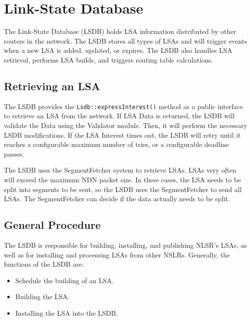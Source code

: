 \section{Link-State Database}
\label{sec:lsdb}

The Link-State Database (LSDB) holds LSA information distributed by
other routers in the network.  The LSDB stores all types of LSAs and
will trigger events when a new LSA is added, updated, or expires.  The
LSDB also handles LSA retrieval, performs LSA builds, and triggers
routing table calculations.

\subsection{Retrieving an LSA}

The LSDB provides the \texttt{Lsdb::expressInterest()} method as a
public interface to retrieve an LSA from the network.  If LSA Data is
returned, the LSDB will validate the Data using the Validator
module. Then, it will perform the necessary LSDB modifications.  If
the LSA Interest times out, the LSDB will retry until it reaches a
configurable maximum number of tries, or a configurable deadline
passes.

The LSDB uses the SegmentFetcher system to retrieve LSAs. LSAs very
often will exceed the maximum NDN packet size. In these cases, the LSA
needs to be split into segments to be sent, so the LSDB uses the
SegmentFetcher to send all LSAs. The SegmentFetcher can decide if the
data actually needs to be split.

\subsection{General Procedure}

The LSDB is responsible for building, installing, and publishing
NLSR's LSAs, as well as for installing and processing LSAs from other
NSLRs. Generally, the functions of the LSDB are:
\begin{itemize}
\item Schedule the building of an LSA.
\item Building the LSA.
\item Installing the LSA into the LSDB.
\end{itemize}

